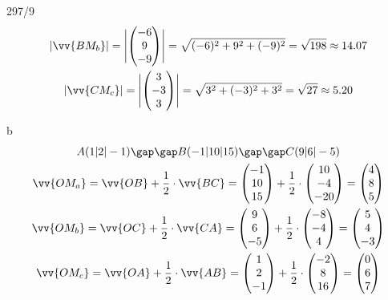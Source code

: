 \begin{exercise}{297/9}
\begin{gather*}
    |\vv{BM_b}| = \Biggl|\begin{pmatrix}-6 \\ 9 \\ -9\end{pmatrix}\Biggr| = \sqrt{(-6)^2 + 9^2 + (-9)^2} = \sqrt{198} \approx 14.07 \\
    |\vv{CM_c}| = \Biggl|\begin{pmatrix}3 \\ -3 \\ 3\end{pmatrix}\Biggr| = \sqrt{3^2 + (-3)^2 + 3^2} = \sqrt{27} \approx 5.20
  \end{gather*}
  \item [b]
  \begin{gather*}
    A(1|2|-1) \gap\gap B(-1|10|15) \gap\gap C(9|6|-5) \\
    \vv{OM_a} = \vv{OB} + \frac{1}{2} \cdot \vv{BC} = \begin{pmatrix}-1 \\ 10 \\ 15\end{pmatrix} + \frac{1}{2} \cdot \begin{pmatrix}10 \\ -4 \\ -20\end{pmatrix} = \begin{pmatrix}4 \\ 8 \\ 5\end{pmatrix} \\
    \vv{OM_b} = \vv{OC} + \frac{1}{2} \cdot \vv{CA} = \begin{pmatrix}9 \\ 6 \\ -5\end{pmatrix} + \frac{1}{2} \cdot \begin{pmatrix}-8 \\ -4 \\ 4\end{pmatrix} = \begin{pmatrix}5 \\ 4 \\ -3\end{pmatrix} \\
    \vv{OM_c} = \vv{OA} + \frac{1}{2} \cdot \vv{AB} = \begin{pmatrix}1 \\ 2 \\ -1\end{pmatrix} + \frac{1}{2} \cdot \begin{pmatrix}-2 \\ 8 \\ 16\end{pmatrix} = \begin{pmatrix}0 \\ 6 \\ 7\end{pmatrix} \\

\end{gather*}
\end{exercise}
